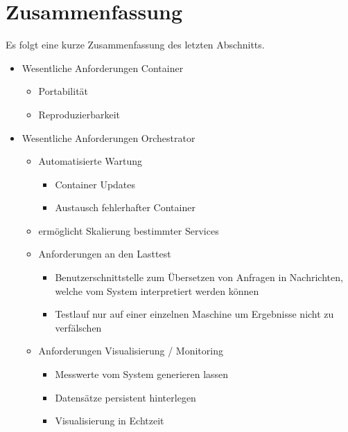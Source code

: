 \newpage

\section{Zusammenfassung}

Es folgt eine kurze Zusammenfassung des letzten Abschnitts.

\begin{itemize}
  \item Wesentliche Anforderungen Container
  \begin{itemize}
    \item Portabilität
    \item Reproduzierbarkeit
  \end{itemize}
  \item Wesentliche Anforderungen Orchestrator
  \begin{itemize}
    \item Automatisierte Wartung 
    \begin{itemize}
      \item Container Updates
      \item Austausch fehlerhafter Container
    \end{itemize}
    \item ermöglicht Skalierung bestimmter Services
  \end{itemize}
  \begin{itemize}
    \item Anforderungen an den Lasttest
    \begin{itemize}
      \item Benutzerschnittstelle zum Übersetzen von Anfragen in Nachrichten, welche vom System interpretiert werden können
      \item Testlauf nur auf einer einzelnen Maschine um Ergebnisse nicht zu verfälschen
    \end{itemize}
  \end{itemize}
  \begin{itemize}
    \item Anforderungen Visualisierung / Monitoring
    \begin{itemize}
      \item Messwerte vom System generieren lassen
      \item Datensätze persistent hinterlegen
      \item Visualisierung in Echtzeit
    \end{itemize}
  \end{itemize}
\end{itemize}
